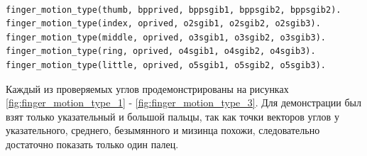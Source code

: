 \begin{lstlisting}[caption=Знания о типах проверок каждого пальца, label=facts:fingermotiontype]
%finger_motion_type(FingerType, AbductionType, Flexion1, Flexion2, Flexion3).

finger_motion_type(thumb, bpprived, bppsgib1, bppsgib2, bppsgib2).
finger_motion_type(index, oprived, o2sgib1, o2sgib2, o2sgib3).
finger_motion_type(middle, oprived, o3sgib1, o3sgib2, o3sgib3).
finger_motion_type(ring, oprived, o4sgib1, o4sgib2, o4sgib3).
finger_motion_type(little, oprived, o5sgib1, o5sgib2, o5sgib3).
\end{lstlisting}

\newpage

\hspace{0.6cm} Каждый из проверяемых углов продемонстрированы на рисунках \ref{fig:finger_motion_type_1} - \ref{fig:finger_motion_type_3}. Для демонстрации был взят только указательный и большой пальцы, так как точки векторов углов у указательного, среднего, безымянного и мизинца похожи, следовательно достаточно показать только один палец.

